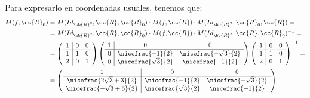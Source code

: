 \begin{ejercicio}
    Para expresarlo en coordenadas usuales, tenemos que:
    \begin{equation*}
        \begin{split}
            M(f,\cc{R}_0) &= M(Id_{\bb{R}^2}, \cc{R}, \cc{R}_0) \cdot M(f,\cc{R}) \cdot M(Id_{\bb{R}^2}, \cc{R}_0, \cc{R}) =\\
            &= M(Id_{\bb{R}^2}, \cc{R}, \cc{R}_0) \cdot M(f,\cc{R}) \cdot M(Id_{\bb{R}^2}, \cc{R}, \cc{R}_0)^{-1} =\\
            &=\left(\begin{array}{c|cc}
                1 & 0 & 0 \\ \hline
                1 & 1 & 0 \\
                2 & 0 & 1
            \end{array}\right)
            \left(\begin{array}{c|cc}
                1 & 0 & 0 \\ \hline
                0 & \nicefrac{-1}{2} & \nicefrac{-\sqrt{3}}{2} \\
                0 & \nicefrac{\sqrt{3}}{2} & \nicefrac{-1}{2}
            \end{array}\right)
            \left(\begin{array}{c|cc}
                1 & 0 & 0 \\ \hline
                1 & 1 & 0 \\
                2 & 0 & 1
            \end{array}\right)^{-1} =\\
            &= \left(\begin{array}{c|cc}
                1 & 0 & 0 \\ \hline
                \nicefrac{2\sqrt{3}+3}{2} & \nicefrac{-1}{2} & \nicefrac{-\sqrt{3}}{2} \\
                \nicefrac{-\sqrt{3}+6}{2} & \nicefrac{\sqrt{3}}{2} & \nicefrac{-1}{2}
            \end{array}\right)
        \end{split}
    \end{equation*}
\end{ejercicio}

